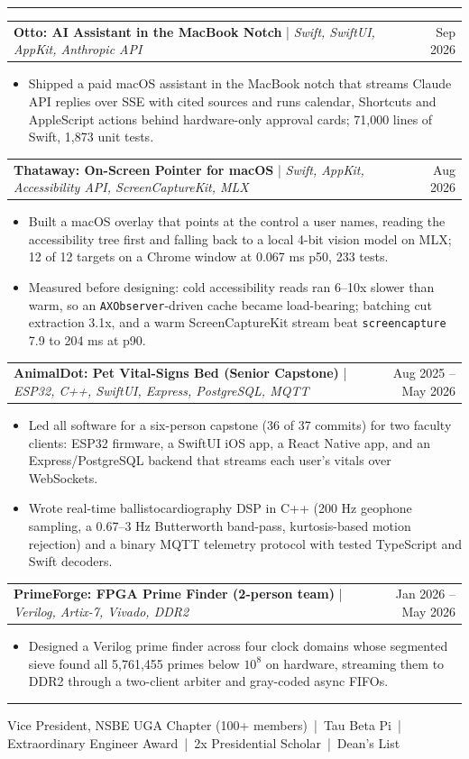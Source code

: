 \documentclass[letterpaper,10pt]{article}
\makeatletter
\newcommand{\sectiontitle}[1]{\vspace{4pt}{\textbf{\large #1}}\par\vspace{-6pt}\rule{\textwidth}{0.4pt}\par\vspace{1pt}}
\newcommand{\projectheading}[3]{\begin{tabularx}{\textwidth}{@{}X r@{}}\textbf{#1} \;|\; \textit{#2} & #3 \\ \end{tabularx}\par\vspace{1pt}}
\makeatother
\begin{document}
\sectiontitle{PROJECTS}
\projectheading{Otto: AI Assistant in the MacBook Notch}{Swift, SwiftUI, AppKit, Anthropic API}{Sep 2026}
\begin{itemize}
\item Shipped a paid macOS assistant in the MacBook notch that streams Claude API replies over SSE with cited sources and runs calendar, Shortcuts and AppleScript actions behind hardware-only approval cards; 71,000 lines of Swift, 1,873 unit tests.
\end{itemize}
\projectheading{Thataway: On-Screen Pointer for macOS}{Swift, AppKit, Accessibility API, ScreenCaptureKit, MLX}{Aug 2026}
\begin{itemize}
\item Built a macOS overlay that points at the control a user names, reading the accessibility tree first and falling back to a local 4-bit vision model on MLX; 12 of 12 targets on a Chrome window at 0.067 ms p50, 233 tests.
\item Measured before designing: cold accessibility reads ran 6--10x slower than warm, so an \texttt{AXObserver}-driven cache became load-bearing; batching cut extraction 3.1x, and a warm ScreenCaptureKit stream beat \texttt{screencapture} 7.9 to 204 ms at p90.
\end{itemize}
\projectheading{AnimalDot: Pet Vital-Signs Bed (Senior Capstone)}{ESP32, C++, SwiftUI, Express, PostgreSQL, MQTT}{Aug 2025 -- May 2026}
\begin{itemize}
\item Led all software for a six-person capstone (36 of 37 commits) for two faculty clients: ESP32 firmware, a SwiftUI iOS app, a React Native app, and an Express/PostgreSQL backend that streams each user's vitals over WebSockets.
\item Wrote real-time ballistocardiography DSP in C++ (200 Hz geophone sampling, a 0.67--3 Hz Butterworth band-pass, kurtosis-based motion rejection) and a binary MQTT telemetry protocol with tested TypeScript and Swift decoders.
\end{itemize}
\projectheading{PrimeForge: FPGA Prime Finder (2-person team)}{Verilog, Artix-7, Vivado, DDR2}{Jan 2026 -- May 2026}
\begin{itemize}
\item Designed a Verilog prime finder across four clock domains whose segmented sieve found all 5,761,455 primes below $10^8$ on hardware, streaming them to DDR2 through a two-client arbiter and gray-coded async FIFOs.
\end{itemize}

\sectiontitle{LEADERSHIP \& HONORS}
{\small Vice President, NSBE UGA Chapter (100+ members) \,|\, Tau Beta Pi \,|\, Extraordinary Engineer Award \,|\, 2x Presidential Scholar \,|\, Dean's List}
\end{document}
